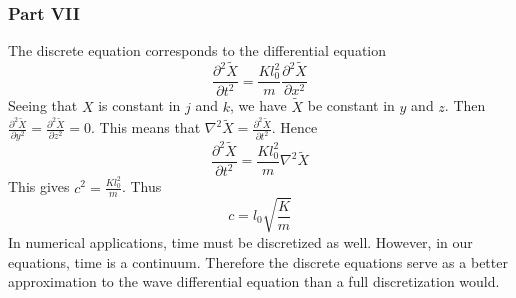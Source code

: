 \documentclass[letterpaper,12pt]{article}
\newcommand*{\npderiv}[3]{\frac{\partial^{#3} #1}{\partial #2^{#3}}}
\begin{document}
\begin{flushleft}
    \subsubsection*{Part VII}
    The discrete equation corresponds to the differential equation
    $$\npderiv{\tilde{X}}{t}{2} = \frac{Kl_0^2}{m}\npderiv{\tilde{X}}{x}{2}$$
    Seeing that $X$ is constant in $j$ and $k$, we have $\tilde{X}$ be constant in $y$ and $z$. Then $\npderiv{\tilde{X}}{y}{2} = \npderiv{\tilde{X}}{z}{2} = 0$. This means that $\nabla^2 \tilde{X} = \npderiv{\tilde{X}}{t}{2}$. Hence
    $$\boxed{\npderiv{\tilde{X}}{t}{2} = \frac{Kl_0^2}{m}\nabla^2\tilde{X}}$$
    This gives $c^2 = \frac{Kl_0^2}{m}$. Thus
    $$\boxed{c = l_0\sqrt{\frac{K}{m}}}$$
    In numerical applications, time must be discretized as well. However, in our equations, time is a continuum. Therefore the discrete equations serve as a better approximation to the wave differential equation than a full discretization would.


\end{flushleft}
\end{document}
